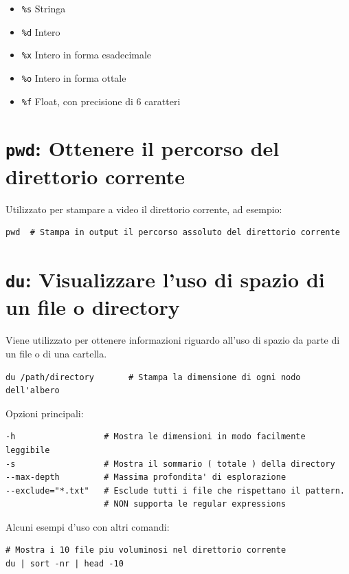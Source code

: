\documentclass[a4paper]{report}
\newenvironment{info}{\begin{tcolorbox}[fonttitle=\sffamily\bfseries\large,title=Info,colframe=blue!75!white]}{\end{tcolorbox}}
\newenvironment{code}{\begin{tcolorbox}[size=small]}{\end{tcolorbox}}
\begin{document}
\begin{itemize}
	\item \texttt{\%s} Stringa
	\item \texttt{\%d} Intero
	\item \texttt{\%x} Intero in forma esadecimale
	\item \texttt{\%o} Intero in forma ottale
	\item \texttt{\%f} Float, con precisione di 6 caratteri
\end{itemize}


\section{\texttt{pwd}: Ottenere il percorso del direttorio corrente}

Utilizzato per stampare a video il direttorio corrente, ad esempio:

\begin{code}
\begin{lstlisting}
pwd  # Stampa in output il percorso assoluto del direttorio corrente
\end{lstlisting}
\end{code}

\section{\texttt{du}: Visualizzare l'uso di spazio di un file o directory}

Viene utilizzato per ottenere informazioni riguardo all'uso di spazio da parte di un file o di una cartella.

\begin{code}
\begin{lstlisting}
du /path/directory       # Stampa la dimensione di ogni nodo dell'albero
\end{lstlisting}

Opzioni principali:

\begin{lstlisting}
-h                  # Mostra le dimensioni in modo facilmente leggibile
-s                  # Mostra il sommario ( totale ) della directory
--max-depth         # Massima profondita' di esplorazione
--exclude="*.txt"   # Esclude tutti i file che rispettano il pattern. 
                    # NON supporta le regular expressions
\end{lstlisting}
\end{code}

\begin{info}
Alcuni esempi d'uso con altri comandi:

\begin{lstlisting}
# Mostra i 10 file piu voluminosi nel direttorio corrente
du | sort -nr | head -10
\end{lstlisting}
\end{info}
\end{document}
